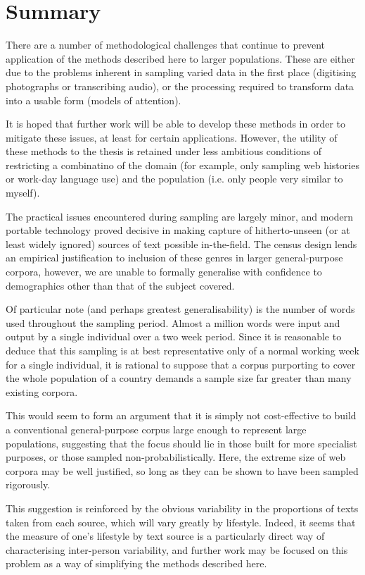 \section{Summary}
There are a number of methodological challenges that continue to prevent application of the methods described here to larger populations.  These are either due to the problems inherent in sampling varied data in the first place (digitising photographs or transcribing audio), or the processing required to transform data into a usable form (models of attention).

It is hoped that further work will be able to develop these methods in order to mitigate these issues, at least for certain applications.  However, the utility of these methods to the thesis is retained under less ambitious conditions of restricting a combinatino of the domain (for example, only sampling web histories or work-day language use) and the population (i.e. only people very similar to myself).

The practical issues encountered during sampling are largely minor, and modern portable technology proved decisive in making capture of hitherto-unseen (or at least widely ignored) sources of text possible in-the-field.  The census design lends an empirical justification to inclusion of these genres in larger general-purpose corpora, however, we are unable to formally generalise with confidence to demographics other than that of the subject covered.

Of particular note (and perhaps greatest generalisability) is the number of words used throughout the sampling period.  Almost a million words were input and output by a single individual over a two week period.  Since it is reasonable to deduce that this sampling is at best representative only of a normal working week for a single individual, it is rational to suppose that a corpus purporting to cover the whole population of a country demands a sample size far greater than many existing corpora.


This would seem to form an argument that it is simply not cost-effective to build a conventional general-purpose corpus large enough to represent large populations, suggesting that the focus should lie in those built for more specialist purposes, or those sampled non-probabilistically.  Here, the extreme size of web corpora may be well justified, so long as they can be shown to have been sampled rigorously.


This suggestion is reinforced by the obvious variability in the proportions of texts taken from each source, which will vary greatly by lifestyle.  Indeed, it seems that the measure of one's lifestyle by text source is a particularly direct way of characterising inter-person variability, and further work may be focused on this problem as a way of simplifying the methods described here.


